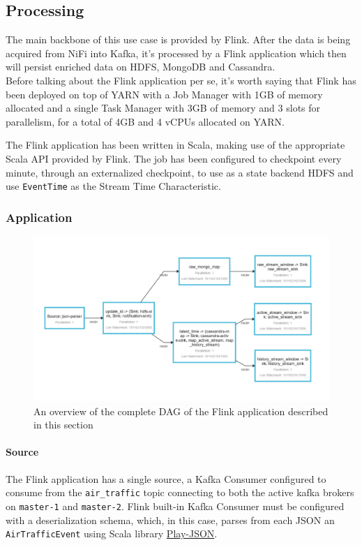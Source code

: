 \subsection{Processing}

The main backbone of this use case is provided by Flink. After the data is being acquired from NiFi into Kafka, it's processed by a Flink application which then will persist enriched data on HDFS, MongoDB and Cassandra.
\\
Before talking about the Flink application per se, it's worth saying that Flink has been deployed on top of YARN with a Job Manager with 1GB of memory allocated and a single Task Manager with 3GB of memory and 3 slots for parallelism, for a total of 4GB and 4 vCPUs allocated on YARN. 

The Flink application has been written in Scala, making use of the appropriate Scala API provided by Flink. The job has been configured to checkpoint every minute, through an externalized checkpoint, to use as a state backend HDFS and use \texttt{EventTime} as the Stream Time Characteristic.

\subsubsection{Application}

\begin{figure}[h]
    \centering
    \includegraphics[width=0.8\linewidth]{Figures/flink_job}
    \caption{An overview of the complete DAG of the Flink application described in this section}
    \label{fig:flinkjob}
\end{figure}


\paragraph{Source}
The Flink application has a single source, a Kafka Consumer configured to consume from the \texttt{air\_traffic} topic connecting to both the active kafka brokers on \texttt{master-1} and \texttt{master-2}. Flink built-in Kafka Consumer must be configured with a deserialization schema, which, in this case, parses from each JSON an \texttt{AirTrafficEvent} using Scala library \href{https://www.playframework.com/documentation/2.6.x/ScalaJson#The-Play-JSON-library}{Play-JSON}.

